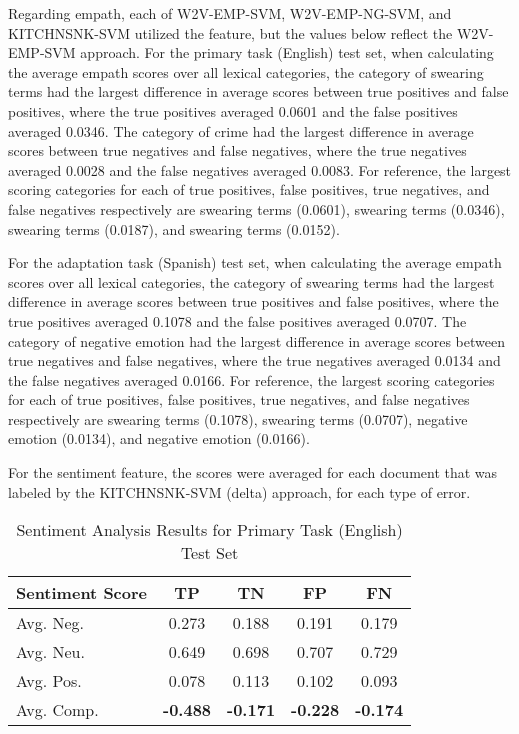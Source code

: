 \documentclass[11pt,a4paper]{article}
\begin{document}
Regarding empath, each of W2V-EMP-SVM, W2V-EMP-NG-SVM, and KITCHNSNK-SVM utilized the feature, but the values below reflect the W2V-EMP-SVM approach. For the primary task (English) test set, when calculating the average empath scores over all lexical categories, the category of swearing terms had the largest difference in average scores between true positives and false positives, where the true positives averaged 0.0601 and the false positives averaged 0.0346. The category of crime had the largest difference in average scores between true negatives and false negatives, where the true negatives averaged 0.0028 and the false negatives averaged 0.0083. For reference, the largest scoring categories for each of true positives, false positives, true negatives, and false negatives respectively are swearing terms (0.0601), swearing terms (0.0346), swearing terms (0.0187), and swearing terms (0.0152).

For the adaptation task (Spanish) test set, when calculating the average empath scores over all lexical categories, the category of swearing terms had the largest difference in average scores between true positives and false positives, where the true positives averaged 0.1078 and the false positives averaged 0.0707. The category of negative emotion had the largest difference in average scores between true negatives and false negatives, where the true negatives averaged 0.0134 and the false negatives averaged 0.0166. For reference, the largest scoring categories for each of true positives, false positives, true negatives, and false negatives respectively are swearing terms (0.1078), swearing terms (0.0707), negative emotion (0.0134), and negative emotion (0.0166).

For the sentiment feature, the scores were averaged for each document that was labeled by the KITCHNSNK-SVM (delta) approach, for each type of error.


\begin{table}[h]
\centering
\caption{Sentiment Analysis Results for Primary Task (English) Test Set}
\label{tab:errors}
\small
\begin{tabular}{lcccc}
\hline
Sentiment Score & TP & TN & FP & FN \\
\hline
Avg. Neg. & 0.273 & 0.188 & 0.191 & 0.179 \\
Avg. Neu. & 0.649 & 0.698 & 0.707 & 0.729 \\
Avg. Pos. & 0.078 & 0.113 & 0.102 & 0.093 \\
Avg. Comp. & \textbf{-0.488} & \textbf{-0.171} & \textbf{-0.228} & \textbf{-0.174} \\
 
\hline
\end{tabular}
\end{table}
\end{document}
